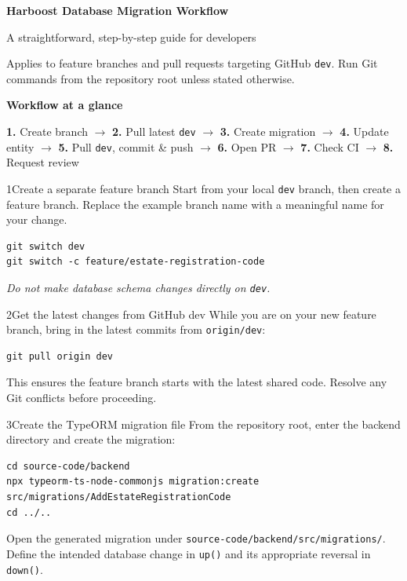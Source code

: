 \documentclass[10pt,a4paper]{article}
\begin{document}
{\Huge\bfseries\color{navy}Harboost Database Migration Workflow}\par
{\large\color{graytext}A straightforward, step-by-step guide for developers}\par
\vspace{2pt}
{\small\color{graytext}Applies to feature branches and pull requests targeting GitHub \texttt{dev}. Run Git commands from the repository root unless stated otherwise.}\par
\vspace{6pt}
\begin{tcolorbox}[colback=pale,colframe=lightborder,boxrule=.7pt,arc=2mm]
\textbf{Workflow at a glance}\par
\small
\textbf{1.} Create branch \(\rightarrow\) \textbf{2.} Pull latest \texttt{dev} \(\rightarrow\) \textbf{3.} Create migration \(\rightarrow\) \textbf{4.} Update entity \(\rightarrow\) \textbf{5.} Pull \texttt{dev}, commit \& push \(\rightarrow\) \textbf{6.} Open PR \(\rightarrow\) \textbf{7.} Check CI \(\rightarrow\) \textbf{8.} Request review
\end{tcolorbox}

\begin{stepbox}{1}{Create a separate feature branch}
Start from your local \texttt{dev} branch, then create a feature branch. Replace the example branch name with a meaningful name for your change.
\begin{lstlisting}[style=command]
git switch dev
git switch -c feature/estate-registration-code
\end{lstlisting}
\textit{Do not make database schema changes directly on \texttt{dev}.}
\end{stepbox}

\begin{stepbox}{2}{Get the latest changes from GitHub dev}
While you are on your new feature branch, bring in the latest commits from \texttt{origin/dev}:
\begin{lstlisting}[style=command]
git pull origin dev
\end{lstlisting}
This ensures the feature branch starts with the latest shared code. Resolve any Git conflicts before proceeding.
\end{stepbox}

\begin{stepbox}{3}{Create the TypeORM migration file}
From the repository root, enter the backend directory and create the migration:
\begin{lstlisting}[style=command]
cd source-code/backend
npx typeorm-ts-node-commonjs migration:create src/migrations/AddEstateRegistrationCode
cd ../..
\end{lstlisting}
Open the generated migration under \texttt{source-code/backend/src/migrations/}. Define the intended database change in \texttt{up()} and its appropriate reversal in \texttt{down()}.
\end{stepbox}
\end{document}
